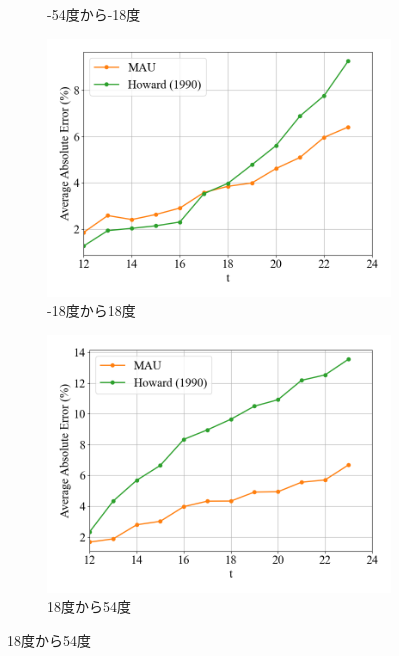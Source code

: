 \begin{figure}[htbp]
\begin{subfigure}{0.5\textwidth}
                \caption{-54度から-18度}
              \end{subfigure} \par
              \begin{subfigure}{0.5\textwidth}
                \centering
                \includegraphics[width=\textwidth]{figures/exp2/lng_error_3.png}
                \caption{-18度から18度}
              \end{subfigure}%
              \begin{subfigure}{0.5\textwidth}
                \centering
                \includegraphics[width=\textwidth]{figures/exp2/lng_error_4.png}
                \caption{18度から54度}
              \end{subfigure} \par

\end{figure}
